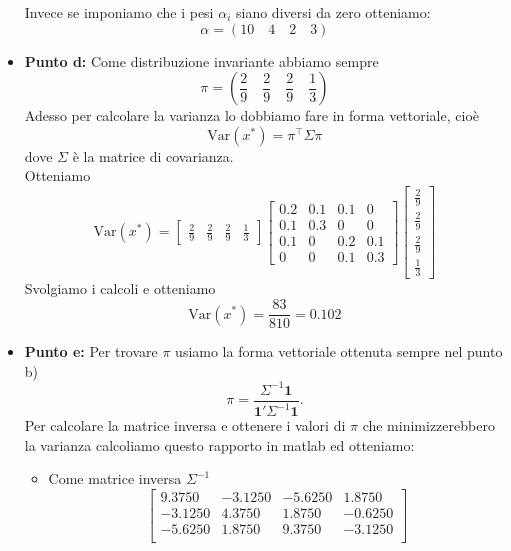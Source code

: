\documentclass[a4paper,12pt]{article}
\begin{document}
\begin{itemize}
\[		\]
		Invece se imponiamo che i pesi $\alpha_i$ siano diversi da zero otteniamo:\\
		\[
		\alpha=(10\quad 4\quad 2\quad 3)
		\]
		\item \textbf{Punto d: }
		Come distribuzione invariante abbiamo sempre\\
		\[
		\pi = \left( \frac{2}{9} \quad \frac{2}{9} \quad \frac{2}{9} \quad \frac{1}{3} \right)
		\]
		Adesso per calcolare la varianza lo dobbiamo fare in forma vettoriale, cioè\\
		\[
		\text{Var}(x^*) = \pi^\top \Sigma \pi
		\]
		dove $\Sigma$ è la matrice di covarianza.\\
		Otteniamo \\
		\[
		\text{Var}(x^*) =
		\begin{bmatrix}
			\frac{2}{9} & \frac{2}{9} & \frac{2}{9} & \frac{1}{3} 
		\end{bmatrix}
		\begin{bmatrix}
			0.2 & 0.1 & 0.1 & 0 \\
			0.1 & 0.3 & 0 & 0 \\
			0.1 & 0 & 0.2 & 0.1 \\
			0 & 0 & 0.1 & 0.3
		\end{bmatrix}	
		\begin{bmatrix}
			\frac{2}{9}\\  \frac{2}{9}\\  \frac{2}{9}\\  \frac{1}{3} 
		\end{bmatrix}
		\]
		Svolgiamo i calcoli e otteniamo\\
		\[
		\text{Var}(x^*) = \frac{83}{810}=0.102
		\]
		\item \textbf{Punto e: }
		Per trovare $\pi$ usiamo la forma vettoriale ottenuta sempre nel punto b)\\
		\[
		\pi = \frac{\Sigma^{-1} \mathbf{1}}{\mathbf{1}' \Sigma^{-1} \mathbf{1}}.
		\]
		Per calcolare la matrice inversa e ottenere i valori di $\pi$ che minimizzerebbero la varianza calcoliamo questo rapporto in matlab ed otteniamo:\\
		\begin{itemize}
			\item Come matrice inversa $\Sigma^{-1}$\\
			\[
			\begin{bmatrix}
				9.3750 & -3.1250 & -5.6250 & 1.8750 \\
				-3.1250 & 4.3750 & 1.8750 & -0.6250 \\
				-5.6250 & 1.8750 & 9.3750 & -3.1250 \\

\end{bmatrix}\]
\end{itemize}
\end{itemize}
\end{document}
